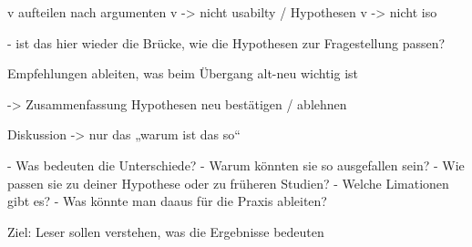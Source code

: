v aufteilen nach argumenten
v -> nicht usabilty / Hypothesen
v -> nicht iso

-	ist das hier wieder die Brücke, wie die Hypothesen zur Fragestellung passen?


Empfehlungen ableiten, was beim Übergang alt-neu wichtig ist

-> Zusammenfassung Hypothesen neu bestätigen / ablehnen

Diskussion
->	nur das „warum ist das so“

- Was bedeuten die Unterschiede?
- Warum könnten sie so ausgefallen sein?
- Wie passen sie zu deiner Hypothese oder zu früheren Studien?
- Welche Limationen gibt es?
- Was könnte man daaus für die Praxis ableiten?

Ziel: Leser sollen verstehen, was die Ergebnisse bedeuten